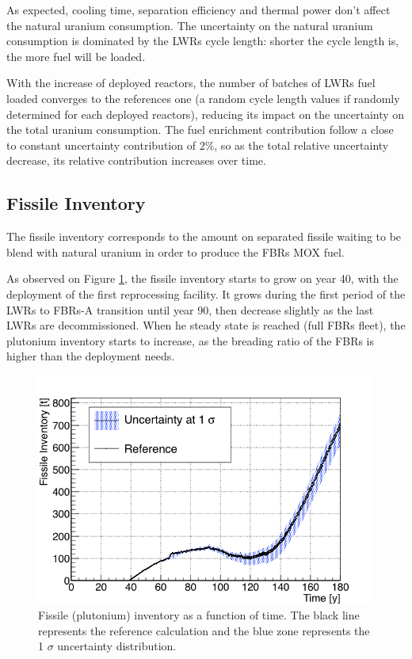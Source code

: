 \documentclass{anstrans}
\begin{document}
As expected, cooling time, separation efficiency and thermal power don't
affect the natural uranium consumption.  The uncertainty on the natural uranium
consumption is dominated by the \glspl{LWR} cycle length: shorter the cycle
length is, the more fuel will be loaded.

With the increase of deployed reactors, the number of batches of \glspl{LWR}
fuel loaded converges to the references one (a random cycle length
values if randomly determined for each deployed reactors), reducing its impact
on the uncertainty on the total uranium consumption.
The fuel enrichment contribution follow a close to constant uncertainty
contribution of $2\%$, so as the total relative uncertainty decrease, its
relative contribution increases over time.

\subsection{Fissile Inventory}
The fissile inventory corresponds to the amount on separated fissile waiting to
be blend with natural uranium in order to produce the \glspl{FBR} MOX fuel.

As observed on Figure \ref{fig:pu_full}, the fissile inventory starts to grow on
year 40, with the deployment of the first reprocessing facility.  It grows
during the first period of the \glspl{LWR} to \glspl{FBR}-A transition until
year 90, then decrease slightly as the last \glspl{LWR} are decommissioned.
When he steady state is reached (full \glspl{FBR} fleet), the plutonium
inventory starts to increase, as the breading ratio of the \glspl{FBR} is higher
than the deployment needs.

\begin{figure}[ht] %
    \centering
    \includegraphics[scale=0.35]{pu_full}
    \caption{Fissile (plutonium) inventory as a function of time.  The black line
        represents the reference calculation and the blue zone
        represents the 1 $\sigma$ uncertainty distribution.}\label{fig:pu_full}
\end{figure}
\end{document}
